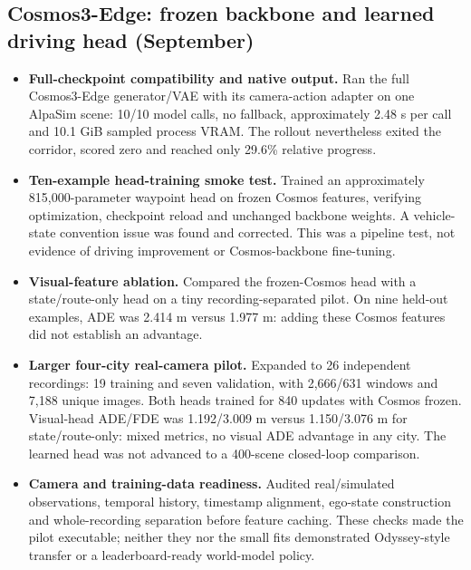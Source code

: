 \subsection{Cosmos3-Edge: frozen backbone and learned driving head (September)}
\begin{itemize}\setlength{\itemsep}{3pt}\setlength{\parsep}{0pt}\setlength{\parskip}{0pt}\setlength{\topsep}{3pt}
\item \textbf{Full-checkpoint compatibility and native output.} Ran the full Cosmos3-Edge \cite{cosmos3edge,cosmos} generator/VAE with its camera-action adapter on one AlpaSim scene: 10/10 model calls, no fallback, approximately 2.48 s per call and 10.1 GiB sampled process VRAM. The rollout nevertheless exited the corridor, scored zero and reached only 29.6\% relative progress.
\item \textbf{Ten-example head-training smoke test.} Trained an approximately 815,000-parameter waypoint head on frozen Cosmos features, verifying optimization, checkpoint reload and unchanged backbone weights. A vehicle-state convention issue was found and corrected. This was a pipeline test, not evidence of driving improvement or Cosmos-backbone fine-tuning.
\item \textbf{Visual-feature ablation.} Compared the frozen-Cosmos head with a state/route-only head on a tiny recording-separated pilot. On nine held-out examples, ADE was 2.414 m versus 1.977 m: adding these Cosmos features did not establish an advantage.
\item \textbf{Larger four-city real-camera pilot.} Expanded to 26 independent recordings: 19 training and seven validation, with 2,666/631 windows and 7,188 unique images. Both heads trained for 840 updates with Cosmos frozen. Visual-head ADE/FDE was 1.192/3.009 m versus 1.150/3.076 m for state/route-only: mixed metrics, no visual ADE advantage in any city. The learned head was not advanced to a 400-scene closed-loop comparison.
\item \textbf{Camera and training-data readiness.} Audited real/simulated observations, temporal history, timestamp alignment, ego-state construction and whole-recording separation before feature caching. These checks made the pilot executable; neither they nor the small fits demonstrated Odyssey-style \cite{odyssey} transfer or a leaderboard-ready world-model policy.
\end{itemize}

